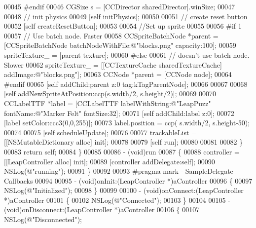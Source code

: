\begin{DoxyCode}
00045 \textcolor{preprocessor}{#endif}
00046 \textcolor{preprocessor}{}        CGSize s = [CCDirector sharedDirector].winSize;
00047         
00048         \textcolor{comment}{// init physics}
00049         [\textcolor{keyword}{self} initPhysics];
00050         
00051         \textcolor{comment}{// create reset button}
00052         [\textcolor{keyword}{self} createResetButton];
00053         
00054         \textcolor{comment}{//Set up sprite}
00055         
00056 \textcolor{preprocessor}{#if 1}
00057 \textcolor{preprocessor}{}        \textcolor{comment}{// Use batch node. Faster}
00058         CCSpriteBatchNode *parent = [CCSpriteBatchNode batchNodeWithFile:@"blocks.png" capacity:100];
00059         spriteTexture\_ = [parent texture];
00060 \textcolor{preprocessor}{#else}
00061 \textcolor{preprocessor}{}        \textcolor{comment}{// doesn't use batch node. Slower}
00062         spriteTexture\_ = [[CCTextureCache sharedTextureCache] addImage:@"blocks.png"];
00063         CCNode *parent = [CCNode node];
00064 \textcolor{preprocessor}{#endif}
00065 \textcolor{preprocessor}{}        [\textcolor{keyword}{self} addChild:parent z:0 tag:kTagParentNode];
00066         
00067         
00068         [\textcolor{keyword}{self} addNewSpriteAtPosition:ccp(s.width/2, s.height/2)];
00069         
00070         CCLabelTTF *label = [CCLabelTTF labelWithString:@"LeapPuzz" fontName:@"Marker Felt" fontSize:32];
00071         [\textcolor{keyword}{self} addChild:label z:0];
00072         [label setColor:ccc3(0,0,255)];
00073         label.position = ccp( s.width/2, s.height-50);
00074         
00075         [\textcolor{keyword}{self} scheduleUpdate];
00076         
00077         trackableList = [[NSMutableDictionary alloc] init];
00078         
00079         [\textcolor{keyword}{self} run];
00080         
00081 
00082     \}
00083     \textcolor{keywordflow}{return} \textcolor{keyword}{self};
00084 \}
00085 
00086 - (void)run
00087 \{
00088     controller = [[LeapController alloc] init];
00089     [controller addDelegate:self];
00090     NSLog(\textcolor{stringliteral}{@"running"});
00091 \}
00092 
00093 \textcolor{preprocessor}{#pragma mark - SampleDelegate Callbacks}
00094 \textcolor{preprocessor}{}
00095 - (void)onInit:(LeapController *)aController
00096 \{
00097     NSLog(\textcolor{stringliteral}{@"Initialized"});
00098 \}
00099 
00100 - (void)onConnect:(LeapController *)aController
00101 \{
00102     NSLog(\textcolor{stringliteral}{@"Connected"});
00103 \}
00104 
00105 - (void)onDisconnect:(LeapController *)aController
00106 \{
00107     NSLog(\textcolor{stringliteral}{@"Disconnected"});

\end{DoxyCode}
